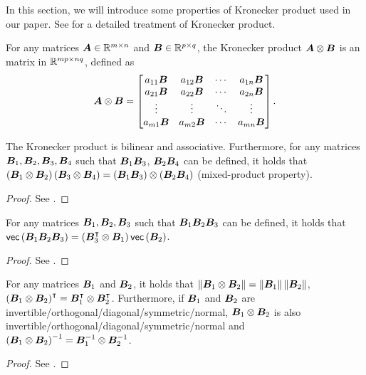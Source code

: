 In this section, we will introduce some properties of Kronecker product used in our paper.
See \citep{zhang2013kronecker} for a detailed treatment of Kronecker product.

For any matrices ${\bm{A}}\in{\mathbb R}^{m\times n}$ and ${\bm{B}}\in{\mathbb R}^{p\times q}$, the Kronecker product ${\bm{A}}\otimes{\bm{B}}$ is an matrix in ${\mathbb R}^{mp\times nq}$, defined as
\begin{equation*}
    {\bm{A}}\otimes {\bm{B}} = \begin{bmatrix} a_{11}{\bm{B}} & a_{12}{\bm{B}} & \cdots & a_{1n}{\bm{B}} \\ a_{21}{\bm{B}} & a_{22}{\bm{B}} & \cdots & a_{2n}{\bm{B}} \\ \vdots & \vdots & \ddots & \vdots \\ a_{m1}{\bm{B}} & a_{m2}{\bm{B}} & \cdots & a_{mn}{\bm{B}} \end{bmatrix}.
\end{equation*}
\begin{lemma}\label{lem:basic_of_KP}
The Kronecker product is bilinear and associative.
Furthermore, for any matrices ${\bm{B}}_1, {\bm{B}}_2, {\bm{B}}_3, {\bm{B}}_4$ such that ${\bm{B}}_1{\bm{B}}_3$, ${\bm{B}}_2{\bm{B}}_4$ can be defined, it holds that
$\left({{\bm{B}}_1\otimes {\bm{B}}_2}\right)\left({{\bm{B}}_3\otimes {\bm{B}}_4}\right)=\left({{\bm{B}}_1{\bm{B}}_3}\right)\otimes\left({{\bm{B}}_2{\bm{B}}_4}\right)$ (mixed-product property).
\begin{proof}
See \citep[Basic properties and Theorem~3][]{zhang2013kronecker}.
\end{proof}
\end{lemma}

\begin{lemma}\label{lem:vec_and_KP}
For any matrices ${\bm{B}}_1, {\bm{B}}_2, {\bm{B}}_3$ such that ${\bm{B}}_1{\bm{B}}_2{\bm{B}}_3$ can be defined, it holds that $\mathsf{vec}\left({{\bm{B}}_1{\bm{B}}_2{\bm{B}}_3}\right)=\left({{\bm{B}}_3^{\intercal}\otimes{\bm{B}}_1}\right)\mathsf{vec}\left({{\bm{B}}_2}\right)$.
\begin{proof}
See \citep[Lemma~4.3.1][]{horn1994topics}.
\end{proof}
\end{lemma}

\begin{lemma}\label{lem:spectral_norm_of_KP}
For any matrices ${\bm{B}}_1$ and ${\bm{B}}_2$, it holds that
$\left\|{{\bm{B}}_1 \otimes {\bm{B}}_2}\right\| = \left\|{{\bm{B}}_1}\right\|\left\|{{\bm{B}}_2}\right\|$, $\left({{\bm{B}}_1\otimes {\bm{B}}_2}\right)^{\intercal}={\bm{B}}_1^{\intercal}\otimes{\bm{B}}_2^{\intercal}$.
Furthermore, if ${\bm{B}}_1$ and ${\bm{B}}_2$ are invertible/orthogonal/diagonal/symmetric/normal, ${\bm{B}}_1\otimes {\bm{B}}_2$ is also invertible/orthogonal/diagonal/symmetric/normal and $\left({{\bm{B}}_1\otimes {\bm{B}}_2}\right)^{-1}={\bm{B}}_1^{-1}\otimes{\bm{B}}_2^{-1}$.
\begin{proof}
See \citep[Basic properties, Theorem~5 and Theorem~7][]{zhang2013kronecker}.
\end{proof}
\end{lemma}

